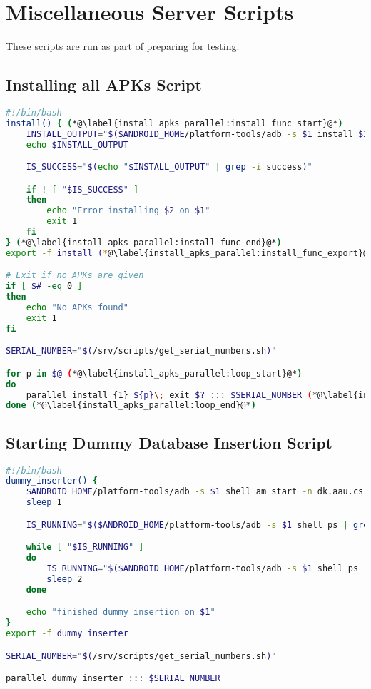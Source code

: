 \chapter{Miscellaneous Server Scripts}\label{app:miscscripts}
These scripts are run as part of preparing for testing.

\section{Installing all APKs Script}\label{app:install_apks}
\begin{lstlisting}[language=bash,caption=Bash script that install APKs on all connected devices in parallel,label=lst:install_apks_parallel]
#!/bin/bash
install() { (*@\label{install_apks_parallel:install_func_start}@*)
    INSTALL_OUTPUT="$($ANDROID_HOME/platform-tools/adb -s $1 install $2)"
    echo $INSTALL_OUTPUT

    IS_SUCCESS="$(echo "$INSTALL_OUTPUT" | grep -i success)"

    if ! [ "$IS_SUCCESS" ]
    then
        echo "Error installing $2 on $1"
        exit 1
    fi
} (*@\label{install_apks_parallel:install_func_end}@*)
export -f install (*@\label{install_apks_parallel:install_func_export}@*)

# Exit if no APKs are given
if [ $# -eq 0 ]
then
    echo "No APKs found"
    exit 1
fi

SERIAL_NUMBER="$(/srv/scripts/get_serial_numbers.sh)"

for p in $@ (*@\label{install_apks_parallel:loop_start}@*)
do
    parallel install {1} ${p}\; exit $? ::: $SERIAL_NUMBER (*@\label{install_apks_parallel:parallel_loop}@*)
done (*@\label{install_apks_parallel:loop_end}@*)
\end{lstlisting}

\section{Starting Dummy Database Insertion Script}\label{app:start_wait_db_inserter_parallel}
\begin{lstlisting}[language=bash,caption=Bash script that starts and waits for the dummy database insertion app in parallel on all connected devices,label=lst:start_wait_db_inserter_parallel]
#!/bin/bash
dummy_inserter() {
    $ANDROID_HOME/platform-tools/adb -s $1 shell am start -n dk.aau.cs.giraf.dummydbinserter/dk.aau.cs.giraf.dummydbinserter.MainActivity
    sleep 1

    IS_RUNNING="$($ANDROID_HOME/platform-tools/adb -s $1 shell ps | grep dk.aau.cs.giraf.dummydbinserter)"

    while [ "$IS_RUNNING" ]
    do
        IS_RUNNING="$($ANDROID_HOME/platform-tools/adb -s $1 shell ps | grep dk.aau.cs.giraf.dummydbinserter)"
        sleep 2
    done

    echo "finished dummy insertion on $1"
}
export -f dummy_inserter

SERIAL_NUMBER="$(/srv/scripts/get_serial_numbers.sh)"

parallel dummy_inserter ::: $SERIAL_NUMBER

\end{lstlisting}